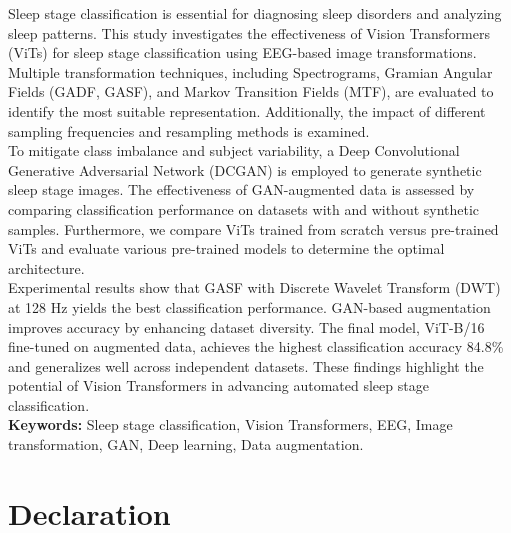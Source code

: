 \documentclass[12pt]{report}
\begin{document}
{\setlength{\parindent}{0pt}
Sleep stage classification is essential for diagnosing sleep disorders and analyzing sleep patterns. This study investigates the effectiveness of Vision Transformers (ViTs) for sleep stage classification using EEG-based image transformations. Multiple transformation techniques, including Spectrograms, Gramian Angular Fields (GADF, GASF), and Markov Transition Fields (MTF), are evaluated to identify the most suitable representation. Additionally, the impact of different sampling frequencies and resampling methods is examined. \\

To mitigate class imbalance and subject variability, a Deep Convolutional Generative Adversarial Network (DCGAN) is employed to generate synthetic sleep stage images. The effectiveness of GAN-augmented data is assessed by comparing classification performance on datasets with and without synthetic samples. Furthermore, we compare ViTs trained from scratch versus pre-trained ViTs and evaluate various pre-trained models to determine the optimal architecture. \\

Experimental results show that GASF with Discrete Wavelet Transform (DWT) at 128 Hz yields the best classification performance. GAN-based augmentation improves accuracy by enhancing dataset diversity. The final model, ViT-B/16 fine-tuned on augmented data, achieves the highest classification accuracy  84.8\% and generalizes well across independent datasets. These findings highlight the potential of Vision Transformers in advancing automated sleep stage classification. \\

\textbf{Keywords:} Sleep stage classification, Vision Transformers, EEG, Image transformation, GAN, Deep learning, Data augmentation.
}

\chapter*{Declaration}
\end{document}
